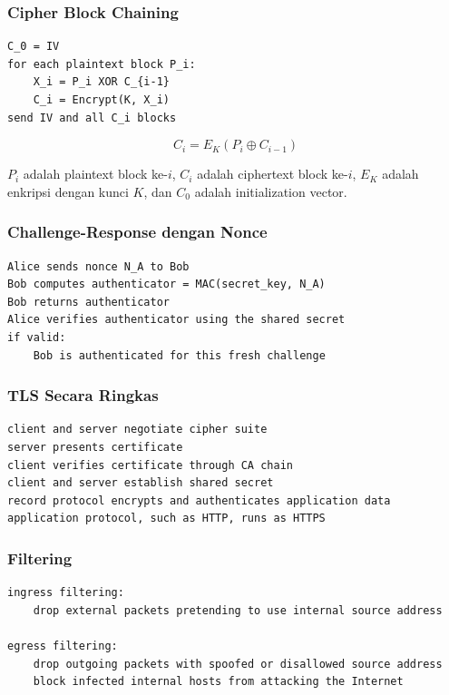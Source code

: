 \subsubsection*{Cipher Block Chaining}

\begin{lstlisting}[language={},caption={Cipher Block Chaining secara konseptual}]
C_0 = IV
for each plaintext block P_i:
    X_i = P_i XOR C_{i-1}
    C_i = Encrypt(K, X_i)
send IV and all C_i blocks
\end{lstlisting}

\[
C_i = E_K(P_i \oplus C_{i-1})
\]

$P_i$ adalah plaintext block ke-$i$, $C_i$ adalah ciphertext block ke-$i$, $E_K$ adalah enkripsi dengan kunci $K$, dan $C_0$ adalah initialization vector.

\subsubsection*{Challenge-Response dengan Nonce}

\begin{lstlisting}[language={},caption={Challenge-response dengan nonce}]
Alice sends nonce N_A to Bob
Bob computes authenticator = MAC(secret_key, N_A)
Bob returns authenticator
Alice verifies authenticator using the shared secret
if valid:
    Bob is authenticated for this fresh challenge
\end{lstlisting}

\subsubsection*{TLS Secara Ringkas}

\begin{lstlisting}[language={},caption={TLS handshake dan record protocol secara konseptual}]
client and server negotiate cipher suite
server presents certificate
client verifies certificate through CA chain
client and server establish shared secret
record protocol encrypts and authenticates application data
application protocol, such as HTTP, runs as HTTPS
\end{lstlisting}

\subsubsection*{Filtering}

\begin{lstlisting}[language={},caption={Ide ingress dan egress filtering}]
ingress filtering:
    drop external packets pretending to use internal source address

egress filtering:
    drop outgoing packets with spoofed or disallowed source address
    block infected internal hosts from attacking the Internet
\end{lstlisting}

